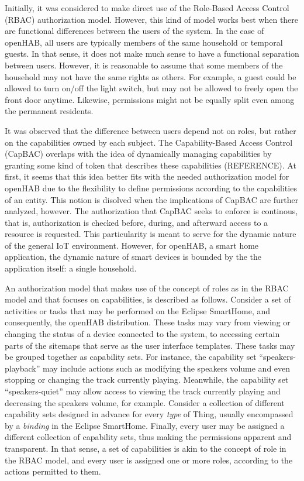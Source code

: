 \documentclass[12pt]{article}
\begin{document}
Initially, it was considered to make direct use of the Role-Based Access Control (RBAC) authorization model. However, this kind of model works best when there are functional differences between the users of the system. In the case of openHAB, all users are typically members of the same household or temporal guests. In that sense, it does not make much sense to have a functional separation between users. However, it is reasonable to assume that some members of the household may not have the same rights as others. For example, a guest could be allowed to turn on/off the light switch, but may not be allowed to freely open the front door anytime. Likewise, permissions might not be equally split even among the permanent residents.

It was observed that the difference between users depend not on roles, but rather on the capabilities owned by each subject. The Capability-Based Access Control (CapBAC) overlaps with the idea of dynamically managing capabilities by granting some kind of token that describes these capabilities (REFERENCE). At first, it seems that this idea better fits with the needed authorization model for openHAB due to the flexibility to define permissions according to the capabilities of an entity. This notion is disolved when the implications of CapBAC are further analyzed, however. The authorization that CapBAC seeks to enforce is continous, that is, authorization is checked before, during, and afterward access to a resource is requested. This particularity is meant to serve for the dynamic nature of the general IoT environment. However, for openHAB, a smart home application, the dynamic nature of smart devices is bounded by the the application itself: a single household.

An authorization model that makes use of the concept of roles as in the RBAC model and that focuses on capabilities, is described as follows. Consider a set of activities or tasks that may be performed on the Eclipse SmartHome, and consequently, the openHAB distribution. These tasks may vary from viewing or changing the status of a device connected to the system, to accessing certain parts of the sitemaps that serve as the user interface templates. These tasks may be grouped together as capability sets. For instance, the capability set ``speakers-playback'' may include actions such as modifying the speakers volume and even stopping or changing the track currently playing. Meanwhile, the capability set ``speakers-quiet'' may allow access to viewing the track currently playing and decreasing the speakers volume, for example. Consider a collection of different capability sets designed in advance for every \emph{type} of Thing, usually encompassed by a \emph{binding} in the Eclipse SmartHome. Finally, every user may be assigned a different collection of capability sets, thus making the permissions apparent and transparent. In that sense, a set of capabilities is akin to the concept of role in the RBAC model, and every user is assigned one or more roles, according to the actions permitted to them.
\end{document}

